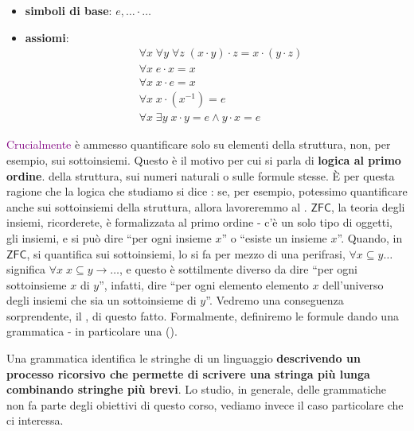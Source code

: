 \begin{example}
    \emph{}\vspace{-0.7cm}
    \begin{itemize}
        \item \textbf{simboli di base}: $e,\ldots\cdot\ldots$
        \item \textbf{assiomi}:
        \begin{align*}
            &\forall x\; \forall y\; \forall z \; (x \cdot y) \cdot z = x \cdot (y \cdot z) \\
            &\forall x\; e \cdot x = x \\
            &\forall x\; x \cdot e = x \\
            &\forall x\; x \cdot (x^{-1}) = e \\
            &\forall x\; \exists y\; x \cdot y = e \land y \cdot x = e
        \end{align*}
    \end{itemize}
\end{example}

\textcolor{purple}{Crucialmente} è ammesso quantificare solo su elementi della struttura, non, per esempio, sui sottoinsiemi. Questo è il motivo per cui si parla di \textbf{logica al primo ordine}.
della struttura, sui numeri naturali o sulle formule stesse. È per questa ragione che la logica che studiamo si dice : se, per esempio, potessimo quantificare anche sui sottoinsiemi
della struttura, allora lavoreremmo al . $\mathsf{ZFC}$, la teoria degli insiemi, ricorderete, è formalizzata al primo ordine - c'è un solo tipo di oggetti, gli insiemi, e si può dire ``per ogni insieme $x$''
o ``esiste un insieme $x$''. Quando, in $\mathsf{ZFC}$, si quantifica sui sottoinsiemi, lo si fa per mezzo di una perifrasi, $\forall x \subseteq y \ldots$ significa $\forall x \; x \subseteq y \to \ldots$, e questo è sottilmente diverso
da dire ``per ogni sottoinsieme $x$ di $y$'', infatti, dire ``per ogni elemento elemento $x$ dell'universo degli insiemi che sia un sottoinsieme di $y$''. Vedremo una conseguenza sorprendente, il , di questo fatto. 
Formalmente, definiremo le formule dando  una grammatica - in particolare una  ().

\medskip

Una grammatica identifica le stringhe di un linguaggio \textbf{descrivendo un processo ricorsivo che permette di scrivere una stringa più lunga combinando stringhe più brevi}.
Lo studio, in generale, delle grammatiche non fa parte degli obiettivi di questo corso, vediamo invece il caso particolare che ci interessa.

